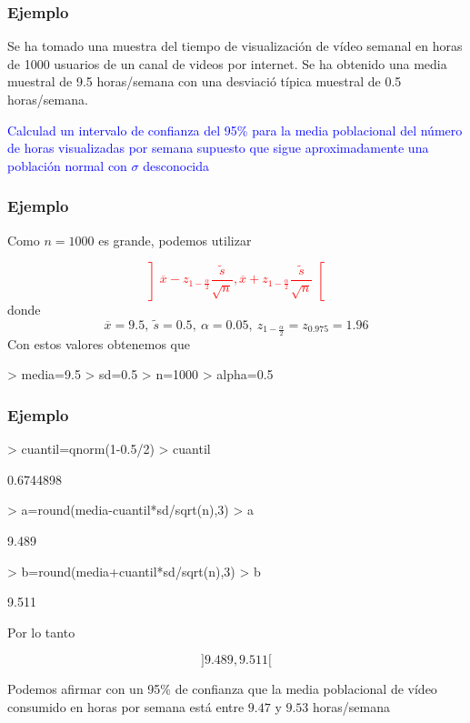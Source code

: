 \documentclass[12pt,t]{beamer}
\newcommand{\red}[1]{\textcolor{red}{#1}}
\newcommand{\blue}[1]{\textcolor{blue}{#1}}
\theoremstyle{plain}
\theoremstyle{definition}
\begin{document}
\begin{frame}
\frametitle{Ejemplo}
\vspace*{-2ex}

Se ha tomado una muestra del tiempo de visualización de vídeo semanal en horas de  1000  usuarios de un canal de videos por internet. Se ha obtenido  una media   muestral de 9.5 horas/semana con una desviació típica muestral de 0.5 horas/semana. 
\medskip

\blue{Calculad un intervalo de confianza  del 95\% para la media poblacional del número de horas visualizadas por semana supuesto que sigue aproximadamente una población normal con  $\sigma$ desconocida}

\end{frame}


\begin{frame}[fragile]
\frametitle{Ejemplo}
\vspace*{-2ex}

Como $n=1000$ es grande, podemos utilizar

\red{$$
\left]\overline{x}-z_{1-\frac{\alpha}{2}}\frac{\widetilde{s}}{\sqrt{n}},
    \overline{x}+z_{1-\frac{\alpha}{2}}\frac{\widetilde{s}}{\sqrt{n}}\right[
$$}
donde
$$
\overline{x}=9.5,\ \widetilde{s}=0.5,\
\alpha=0.05,\  z_{1-\frac{\alpha}{2}}=z_{0.975}=1.96
$$
Con estos valores obtenemos que 

\begin{Schunk}
\begin{Sinput}
> media=9.5
> sd=0.5
> n=1000
> alpha=0.5
\end{Sinput}
\end{Schunk}
\end{frame}

\begin{frame}[fragile]
\frametitle{Ejemplo}
\begin{Schunk}
\begin{Sinput}
> cuantil=qnorm(1-0.5/2)
> cuantil
\end{Sinput}
\begin{Soutput}
[1] 0.6744898
\end{Soutput}
\begin{Sinput}
> a=round(media-cuantil*sd/sqrt(n),3)
> a
\end{Sinput}
\begin{Soutput}
[1] 9.489
\end{Soutput}
\begin{Sinput}
> b=round(media+cuantil*sd/sqrt(n),3)
> b
\end{Sinput}
\begin{Soutput}
[1] 9.511
\end{Soutput}
\end{Schunk}



Por lo tanto 

$$
]9.489,9.511[
$$

Podemos afirmar con un 95\% de confianza  que la media poblacional de  vídeo consumido en horas por semana está entre $9.47$  y  $9.53$ horas/semana


\end{frame}
\end{document}
